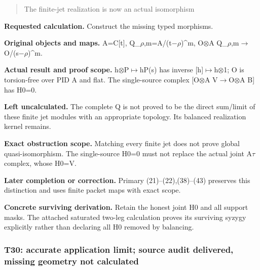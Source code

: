 \documentclass[10pt,a4paper,oneside]{report}
\begin{document}
\begin{quote}
The finite-jet realization is now an actual isomorphism
\end{quote}

\textbf{Requested calculation.} Construct the missing typed morphisms.

\textbf{Original objects and maps.} A=C{[}t{]},
Q\_\allowbreak{}\ensuremath{ρ}\allowbreak{},m=A/(t\allowbreak{}\ensuremath{−}\allowbreak{}\allowbreak{}\ensuremath{ρ}\allowbreak{})\textasciicircum{}m,
O\allowbreak{}\ensuremath{⊗}\allowbreak{}A
Q\_\allowbreak{}\ensuremath{ρ}\allowbreak{},m\allowbreak{}\ensuremath{→}\allowbreak{}O/(s\allowbreak{}\ensuremath{−}\allowbreak{}\allowbreak{}\ensuremath{ρ}\allowbreak{})\textasciicircum{}m.

\textbf{Actual result and proof scope.}
h\allowbreak{}\ensuremath{⊗}\allowbreak{}P\allowbreak{}\ensuremath{↦}\allowbreak{}hP(s)
has inverse
[h]\allowbreak{}\ensuremath{↦}\allowbreak{}h\allowbreak{}\ensuremath{⊗}\allowbreak{}1;
O is torsion-free over PID A and flat. The single-source complex
[O\allowbreak{}\ensuremath{⊗}\allowbreak{}A
V\allowbreak{}\ensuremath{→}\allowbreak{}O\allowbreak{}\ensuremath{⊗}\allowbreak{}A
B{]} has H0=0.

\textbf{Left uncalculated.} The complete Q is not proved to be the
direct sum/limit of these finite jet modules with an appropriate
topology. Its balanced realization kernel remains.

\textbf{Exact obstruction scope.} Matching every finite jet does not
prove global quasi-isomorphism. The single-source H0=0 must not replace
the actual joint A\allowbreak{}\ensuremath{τ}\allowbreak{} complex,
whose H0=V.

\textbf{Later completion or correction.} Primary (21)--(22),(38)--(43)
preserves this distinction and uses finite packet maps with exact scope.

\textbf{Concrete surviving derivation.} Retain the honest joint H0 and
all support masks. The attached saturated two-leg calculation proves its
surviving syzygy explicitly rather than declaring all H0 removed by
balancing.

\subsubsection{T30: accurate application limit; source audit delivered,
missing geometry not
calculated}\label{t30-accurate-application-limit-source-audit-delivered-missing-geometry-not-calculated}
\end{document}
